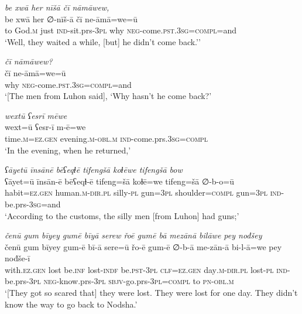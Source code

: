 \ea \label{ŠJ.25}
\textit{be xwā her nīšā čī nāmāwew,} \\ 
\gll be xwā her ∅-nīš-ā čī ne-āmā=we=ū \\ 
 to God\textsc{.m} just \textsc{ind-}sit.prs\textsc{-3pl} why \textsc{neg-}come\textsc{.pst}\textsc{.3sg}\textsc{=compl}=and \\ 
\glt `Well, they waited a while, [but] he didn’t come back.’'
\z 
 
\ea \label{ŠJ.26}
\textit{čī nāmāwew?} \\ 
\gll čī ne-āmā=we=ū \\ 
 why \textsc{neg-}come\textsc{.pst}\textsc{.3sg}\textsc{=compl}=and \\ 
\glt `[The men from Luhon said], ‘Why hasn’t he come back?'
\z 
 
\ea \label{ŠJ.27}
\textit{wextū ʕesrī mēwe} \\ 
\gll wext=ū ʕesr-ī m-ē=we \\ 
 time\textsc{.m}\textsc{=ez.gen} evening\textsc{.m}\textsc{-obl}\textsc{.m} \textsc{ind-}come.prs\textsc{.3sg}\textsc{=compl} \\ 
\glt `In the evening, when he returned,'
\z 
 
\ea \label{ŠJ.28}
\textit{ʕāyetū īnsānē bēʕeqɫē tifengšā koɫēwe tifengšā bow} \\ 
\gll ʕāyet=ū īnsān-ē bēʕeqɫ-ē tifeng=šā koɫē=we tifeng=šā ∅-b-o=ū \\ 
 habit\textsc{=ez.gen} human\textsc{.m}\textsc{-dir}\textsc{.pl} silly\textsc{\textsc{-pl}} gun\textsc{=3pl} shoulder\textsc{=compl} gun\textsc{=3pl} \textsc{ind-}be.prs\textsc{-3sg}=and \\ 
\glt `According to the customs, the silly men [from Luhon] had guns;'
\z 
 
\ea \label{ŠJ.39}
\textit{čenū gum bīyey gumē bīyā serew řoē gumē bā mezānā bilāwe pey nođšey} \\ 
\gll čenū gum bīyey gum-ē bī-ā sere=ū řo-ē gum-ē ∅-b-ā me-zān-ā bi-l-ā=we pey nođše-ī \\ 
 with\textsc{.ez.gen} lost be\textsc{.inf} lost\textsc{-indf} be\textsc{.pst}\textsc{-3pl} \textsc{clf}\textsc{=ez.gen} day\textsc{.m}\textsc{-dir}\textsc{.pl} lost\textsc{\textsc{-pl}} \textsc{ind-}be.prs\textsc{-3pl} \textsc{neg-}know.prs\textsc{-3pl} \textsc{sbjv-}go.prs\textsc{-3pl}\textsc{=compl} to \textsc{pn}\textsc{-obl}\textsc{.m} \\ 
\glt `[They got so scared that] they were lost. They were lost for one day. They didn’t know the way to go back to Nodsha.'
\z 
 
